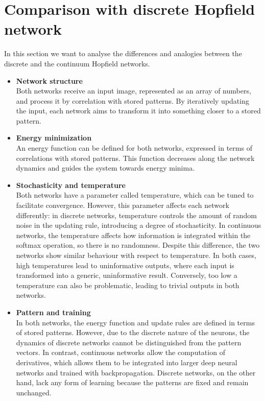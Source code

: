 \section{Comparison with discrete Hopfield network}
In this section we want to analyse the differences and analogies between the discrete and the continuum Hopfield networks.
\begin{itemize}
	\item \textbf{Network structure}\\
	Both networks receive an input image, represented as an array of numbers, and process it by correlation with stored patterns. By iteratively updating the input, each network aims to transform it into something closer to a stored pattern.
	\item \textbf{Energy minimization}\\
	An energy function can be defined for both networks, expressed in terms of correlations with stored patterns. This function decreases along the network dynamics and guides the system towards energy minima.
	\item \textbf{Stochasticity and temperature} \\
	Both networks have a parameter called temperature, which can be tuned to facilitate convergence. However, this parameter affects each network differently: in discrete networks, temperature controls the amount of random noise in the updating rule, introducing a degree of stochasticity. In continuous networks, the temperature affects how information is integrated within the softmax operation, so there is no randomness. Despite this difference, the two networks show similar behaviour with respect to temperature. In both cases, high temperatures lead to uninformative outputs, where each input is transformed into a generic, uninformative result. Conversely, too low a temperature can also be problematic, leading to trivial outputs in both networks.
    \item \textbf{Pattern and training}\\
    In both networks, the energy function and update rules are defined in terms of stored patterns. However, due to the discrete nature of the neurons, the dynamics of discrete networks cannot be distinguished from the pattern vectors. In contrast, continuous networks allow the computation of derivatives, which allows them to be integrated into larger deep neural networks and trained with backpropagation. Discrete networks, on the other hand, lack any form of learning because the patterns are fixed and remain unchanged.
\end{itemize}
